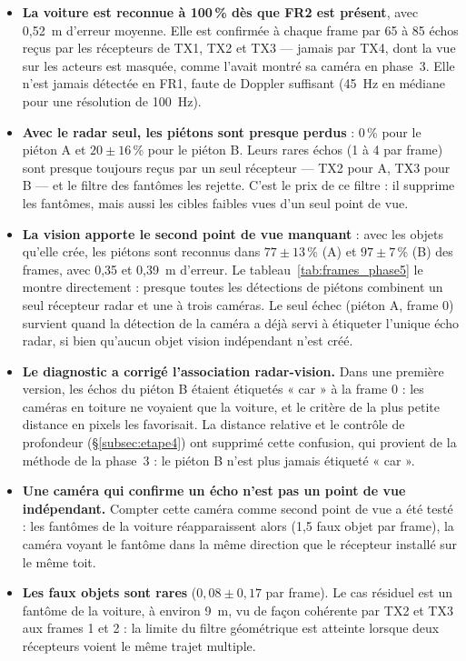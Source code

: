 \documentclass[12pt,a4paper,titlepage]{article}
\begin{document}
\begin{itemize}[leftmargin=1.5em]
    \item \textbf{La voiture est reconnue à 100\,\% dès que FR2 est présent}, avec 0,52~m d'erreur moyenne. Elle est confirmée à chaque frame par 65 à 85 échos reçus par les récepteurs de TX1, TX2 et TX3 --- jamais par TX4, dont la vue sur les acteurs est masquée, comme l'avait montré sa caméra en phase~3. Elle n'est jamais détectée en FR1, faute de Doppler suffisant (45~Hz en médiane pour une résolution de 100~Hz).
    \item \textbf{Avec le radar seul, les piétons sont presque perdus} : 0\,\% pour le piéton A et $20 \pm 16$\,\% pour le piéton B. Leurs rares échos (1 à 4 par frame) sont presque toujours reçus par un seul récepteur --- TX2 pour A, TX3 pour B --- et le filtre des fantômes les rejette. C'est le prix de ce filtre : il supprime les fantômes, mais aussi les cibles faibles vues d'un seul point de vue.
    \item \textbf{La vision apporte le second point de vue manquant} : avec les objets qu'elle crée, les piétons sont reconnus dans $77 \pm 13$\,\% (A) et $97 \pm 7$\,\% (B) des frames, avec 0,35 et 0,39~m d'erreur. Le tableau~\ref{tab:frames_phase5} le montre directement : presque toutes les détections de piétons combinent un seul récepteur radar et une à trois caméras. Le seul échec (piéton A, frame 0) survient quand la détection de la caméra a déjà servi à étiqueter l'unique écho radar, si bien qu'aucun objet vision indépendant n'est créé.
    \item \textbf{Le diagnostic a corrigé l'association radar-vision.} Dans une première version, les échos du piéton B étaient étiquetés « car » à la frame 0 : les caméras en toiture ne voyaient que la voiture, et le critère de la plus petite distance en pixels les favorisait. La distance relative et le contrôle de profondeur (\S\ref{subsec:etape4}) ont supprimé cette confusion, qui provient de la méthode de la phase~3 : le piéton B n'est plus jamais étiqueté « car ».
    \item \textbf{Une caméra qui confirme un écho n'est pas un point de vue indépendant.} Compter cette caméra comme second point de vue a été testé : les fantômes de la voiture réapparaissent alors (1,5 faux objet par frame), la caméra voyant le fantôme dans la même direction que le récepteur installé sur le même toit.
    \item \textbf{Les faux objets sont rares} ($0{,}08 \pm 0{,}17$ par frame). Le cas résiduel est un fantôme de la voiture, à environ 9~m, vu de façon cohérente par TX2 et TX3 aux frames 1 et 2 : la limite du filtre géométrique est atteinte lorsque deux récepteurs voient le même trajet multiple.
\end{itemize}
\end{document}
